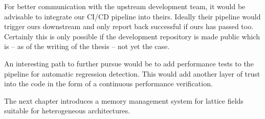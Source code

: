 For better communication with the upstream \quda development team, it would be advisable to integrate our CI/CD pipeline into theirs.
Ideally their pipeline would trigger ours downstream and only report back successful if ours has passed too.
Certainly this is only possible if the \openqxd development repository is made public which is -- as of the writing of the thesis -- not yet the case.

An interesting path to further pursue would be to add performance tests to the pipeline for automatic regression detection.
This would add another layer of trust into the code in the form of a continuous performance verification.

The next chapter introduces a memory management system for lattice fields suitable for heterogeneous architectures.

